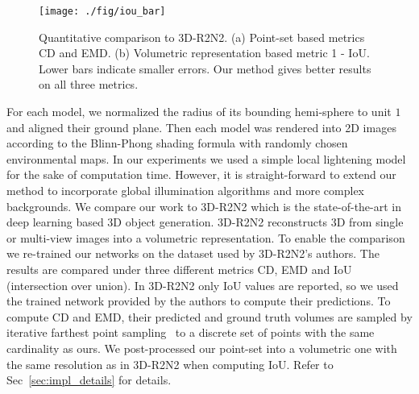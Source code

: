 \documentclass[10pt,twocolumn,letterpaper]{article}
\newcommand{\cmt}[2]{[#1: #2]}
\newcommand{\hao}[1]{\cmt{{\bf Hao}}{{\bf \color{red} #1}}}
\begin{document}
\begin{figure}[t!]
  \centering
  \texttt{[image: ./fig/iou\_bar]}
  \caption{Quantitative comparison to 3D-R2N2. (a) Point-set based metrics CD and EMD. (b) Volumetric representation based metric 1 - IoU. Lower bars indicate smaller errors. Our method gives better results on all three metrics. }\label{fig:comparison}
\end{figure}
For each model, we normalized the radius of its bounding hemi-sphere to unit $1$ and aligned their ground plane. Then each model was rendered into 2D images according to the Blinn-Phong shading formula with randomly chosen environmental maps. In our experiments we used a simple local lightening model for the sake of computation time. However, it is straight-forward to extend our method to incorporate global illumination algorithms and more complex backgrounds. %
We compare our work to 3D-R2N2\cite{choy20163d} which is the state-of-the-art in deep learning based 3D object generation. 3D-R2N2 reconstructs 3D from single or multi-view images into a volumetric representation. To enable the comparison we re-trained our networks on the dataset used by 3D-R2N2's authors. The results are compared under three different metrics CD, EMD and IoU (intersection over union). %
In 3D-R2N2 only IoU values are reported, so we used the trained network provided by the authors to compute their predictions. To compute CD and EMD, their predicted and ground truth volumes are sampled by iterative farthest point sampling~\cite{eldar1997farthest} to a discrete set of points with the same cardinality as ours. We post-processed our point-set into a volumetric one with the same resolution as in 3D-R2N2 when computing IoU. Refer to Sec~\ref{sec:impl_details} for details.
\end{document}
